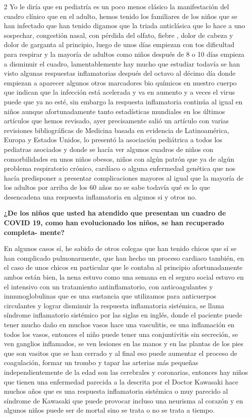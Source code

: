 \documentclass[12pt,spanish,Letterpaper,openany]{book}
\begin{document}
\begin {multicols}{2}
Yo le diría que en pediatría es un poco menos clásico la manifestación del cuadro clínico que
en el adulto, hemos tenido los familiares de los niños que se han infectado que han tenido
digamos que la triada anticlásica que lo hace a uno sospechar, congestión nasal, con pérdida
del olfato, fiebre , dolor de cabeza y dolor de garganta al principio, luego de unos días
empiezan con tos dificultad para respirar y la mayoría de adultos como niños después de 8 o
10 días empieza a disminuir el cuadro, lamentablemente hay mucho que estudiar todavía se
han visto algunas respuestas inflamatorias después del octavo al décimo día donde empiezan
a aparecer algunos otros marcadores bio químicos en nuestro cuerpo que indican que la
infección está acelerada y va en aumento y a veces el virus puede que ya no esté, sin embargo
la respuesta inflamatoria continúa al igual en niños aunque afortunadamente tanto
estadísticas mundiales en los últimos artículos que hemos revisado, ayer precisamente salió
un artículo con varias revisiones bibliográficas de Medicina basada en evidencia de
Latinoamérica, Europa y Estados Unidos, lo presentó la asociación pediátrica a todos los
pediatras asociados y donde se hacía ver algunos cuadros de niños con comorbilidades en
unos niños obesos, niños con algún patrón que ya de algún problema respiratorio crónico,
cardíaco o alguna enfermedad genética que nos hacía predisponer a presentar complicaciones
mayores al igual que la mayoría de los adultos por arriba de los 60 años no se sabe todavía
qué es lo que desencadena una respuesta inflamatoria en algunos si y otros no.

\textbf{¿De los niños que usted ha atendido que presentan un cuadro de COVID 19, como han evolucionado los niños, se han recuperado completa-
mente?}

En algunos casos sí, he sabido de otros colegas que han tenido chicos que sí se han
complicado pulmonarmente, que han hecho un proceso cardiaco también, en el caso de unos
chicos en particular que le contaba al principio afortunadamente ambos están bien, la nena
estuvo como una semana en el seguro social estuvo en el intensivo con un tratamiento
antinflamatorio, con anticoagulantes y inmunoglobulinas que es una sustancia que utilizamos
para anticuerpos circulantes y lograr disminuir la respuesta inflamatoria sistémica, se llama
síndrome inflamatorio sistémico por las siglas en inglés, donde el paciente puede tener mucho
daño en muchos vasos hace una vasculitis, es una inflamación en todos los vasos, entonces
el niño puede tener una conjuntivitis sin secreción, se ven ganglios inflamados, se ven
lesiones en las manos y en las plantas de los pies que son vasitos que se han cerrado y al final
eso puede aumentar el proceso de coagulación, formar un trombo y tapar las arterias más
pequeñas independientemente de la edad son las cerebrales y coronarias, entonces hay niños
que tienen una enfermedad parecida a la descrita por el Doctor Kawasaki hace muchos años
que es una respuesta inflamatoria sistémica o muy parecido al síndrome de Kawasaki que
puede provocar incluso una neurisma al corazón y en algunos niños puede ser de mortal sino
se trata o no se trata a tiempo.


\end{multicols}
\end{document}
